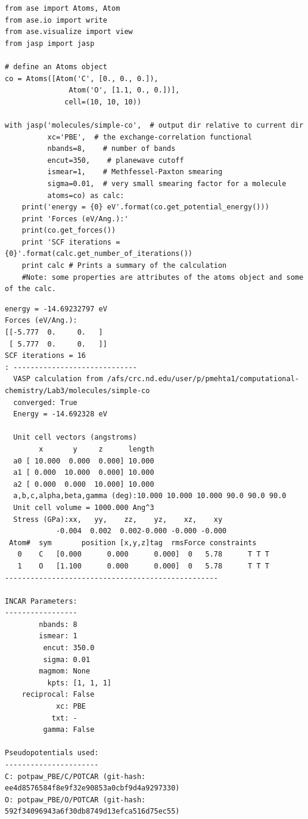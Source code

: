 \documentclass[11pt]{article}
\begin{document}
\begin{verbatim}
from ase import Atoms, Atom
from ase.io import write
from ase.visualize import view
from jasp import jasp

# define an Atoms object
co = Atoms([Atom('C', [0., 0., 0.]),
               Atom('O', [1.1, 0., 0.])],
              cell=(10, 10, 10))

with jasp('molecules/simple-co',  # output dir relative to current dir
          xc='PBE',  # the exchange-correlation functional
          nbands=8,    # number of bands
          encut=350,    # planewave cutoff
          ismear=1,    # Methfessel-Paxton smearing
          sigma=0.01,  # very small smearing factor for a molecule
          atoms=co) as calc:
    print('energy = {0} eV'.format(co.get_potential_energy()))
    print 'Forces (eV/Ang.):'
    print(co.get_forces())
    print 'SCF iterations = {0}'.format(calc.get_number_of_iterations())
    print calc # Prints a summary of the calculation
    #Note: some properties are attributes of the atoms object and some of the calc.
\end{verbatim}

\begin{verbatim}
energy = -14.69232797 eV
Forces (eV/Ang.):
[[-5.777  0.     0.   ]
 [ 5.777  0.     0.   ]]
SCF iterations = 16
: -----------------------------
  VASP calculation from /afs/crc.nd.edu/user/p/pmehta1/computational-chemistry/Lab3/molecules/simple-co
  converged: True
  Energy = -14.692328 eV

  Unit cell vectors (angstroms)
        x       y     z      length
  a0 [ 10.000  0.000  0.000] 10.000
  a1 [ 0.000  10.000  0.000] 10.000
  a2 [ 0.000  0.000  10.000] 10.000
  a,b,c,alpha,beta,gamma (deg):10.000 10.000 10.000 90.0 90.0 90.0
  Unit cell volume = 1000.000 Ang^3
  Stress (GPa):xx,   yy,    zz,    yz,    xz,    xy
            -0.004  0.002  0.002-0.000 -0.000 -0.000
 Atom#  sym       position [x,y,z]tag  rmsForce constraints
   0    C   [0.000      0.000      0.000]  0   5.78      T T T
   1    O   [1.100      0.000      0.000]  0   5.78      T T T
--------------------------------------------------

INCAR Parameters:
-----------------
        nbands: 8
        ismear: 1
         encut: 350.0
         sigma: 0.01
        magmom: None
          kpts: [1, 1, 1]
    reciprocal: False
            xc: PBE
           txt: -
         gamma: False

Pseudopotentials used:
----------------------
C: potpaw_PBE/C/POTCAR (git-hash: ee4d8576584f8e9f32e90853a0cbf9d4a9297330)
O: potpaw_PBE/O/POTCAR (git-hash: 592f34096943a6f30db8749d13efca516d75ec55)
\end{verbatim}
\end{document}

